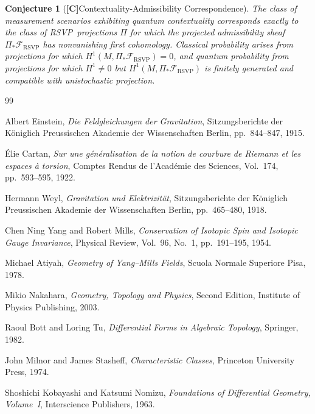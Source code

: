 \documentclass[12pt,a4paper]{article}
\newcommand{\claimC}{\textbf{[C]}\;}
\newtheorem{appconj}[defn]{Conjecture}
\newcommand{\RSVP}{\textrm{RSVP}}
\newcommand{\Sheaf}{\mathcal{F}}
\begin{document}
\begin{appconj}[\claimC Contextuality-Admissibility Correspondence]
The class of measurement scenarios exhibiting quantum contextuality corresponds
exactly to the class of \RSVP\ projections $\Pi$ for which the projected
admissibility sheaf $\Pi_\ast\Sheaf_\RSVP$ has nonvanishing first cohomology.
Classical probability arises from projections for which $H^1(M,\Pi_\ast\Sheaf_\RSVP)=0$,
and quantum probability from projections for which $H^1\neq 0$ but
$H^1(M,\Pi_\ast\Sheaf_\RSVP)$ is finitely generated and compatible with
unistochastic projection.
\end{appconj}

\newpage

\begin{thebibliography}{99}

Albert Einstein,
\textit{Die Feldgleichungen der Gravitation},
Sitzungsberichte der K\"{o}niglich Preussischen Akademie der Wissenschaften Berlin,
pp.~844--847, 1915.

\'{E}lie Cartan,
\textit{Sur une g\'{e}n\'{e}ralisation de la notion de courbure de Riemann et les espaces \`{a} torsion},
Comptes Rendus de l'Acad\'{e}mie des Sciences,
Vol.~174, pp.~593--595, 1922.

Hermann Weyl,
\textit{Gravitation und Elektrizit\"{a}t},
Sitzungsberichte der K\"{o}niglich Preussischen Akademie der Wissenschaften Berlin,
pp.~465--480, 1918.

Chen Ning Yang and Robert Mills,
\textit{Conservation of Isotopic Spin and Isotopic Gauge Invariance},
Physical Review, Vol.~96, No.~1, pp.~191--195, 1954.

Michael Atiyah,
\textit{Geometry of Yang--Mills Fields},
Scuola Normale Superiore Pisa, 1978.

Mikio Nakahara,
\textit{Geometry, Topology and Physics},
Second Edition, Institute of Physics Publishing, 2003.

Raoul Bott and Loring Tu,
\textit{Differential Forms in Algebraic Topology},
Springer, 1982.

John Milnor and James Stasheff,
\textit{Characteristic Classes},
Princeton University Press, 1974.

Shoshichi Kobayashi and Katsumi Nomizu,
\textit{Foundations of Differential Geometry, Volume~I},
Interscience Publishers, 1963.


\end{thebibliography}
\end{document}
